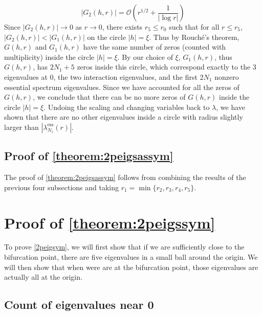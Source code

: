 \documentclass[thesis.tex]{subfiles}
\begin{document}
\[
|G_2(h,r)| = \mathcal{O}\left( r^{1/2} + \frac{1}{|\log r|} \right)
\]
Since $|G_2(h,r)| \rightarrow 0$ as $r \rightarrow 0$, there exists $r_5 \leq r_0$ such that for all $r \leq r_5$, $|G_2(h,r)| < |G_1(h,r)|$ on the circle $|h| = \xi$. Thus by Rouch\'{e}'s theorem, $G(h,r)$ and $G_1(h,r)$ have the same number of zeros (counted with multiplicity) inside the circle $|h| = \xi$. By our choice of $\xi$, $G_1(h,r)$, thus $G(h,r)$, has $2 N_1 + 5$ zeros inside this circle, which correspond exactly to the 3 eigenvalues at 0, the two interaction eigenvalues, and the first $2 N_1$ nonzero essential spectrum eigenvalues. Since we have accounted for all the zeros of $G(h,r)$, we conclude that there can be no more zeros of $G(h,r)$ inside the circle $|h| = \xi$. Undoing the scaling and changing variables back to $\lambda$, we have shown that there are no other eigenvalues inside a circle with radius slightly larger than $|\lambda_{N_1}^{\text{ess}}(r)|$.

\subsection{Proof of \cref{theorem:2peigsassym}}

The proof of \cref{theorem:2peigsassym} follows from combining the results of the previous four subsections and taking $r_1 = \min\{ r_2, r_3, r_4, r_5 \}$.

\section{Proof of \cref{theorem:2peigssym}}

To prove \cref{2peigsym}, we will first show that if we are sufficiently close to the bifurcation point, there are five eigenvalues in a small ball around the origin. We will then show that when were are at the bifurcation point, those eigenvalues are actually all at the origin.

\subsection{Count of eigenvalues near 0}
\end{document}
